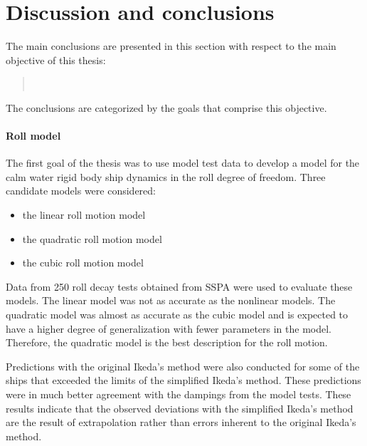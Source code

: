 \chapter{Discussion and conclusions\label{ch:conclusions}}

The main conclusions are presented in this section with respect to the main objective of this thesis:
\begin{quote} 
\vspace{0.1cm}
\objective \\
\vspace{-0.3cm}
\end{quote}
\noindent The conclusions are categorized by the goals that comprise this objective.

\subsubsection*{\normalfont \color{black} \textbf{Roll model}}
The first goal of the thesis was to use model test data to develop a model for the calm water rigid body ship dynamics in the roll degree of freedom. 
Three candidate models were considered:
\vspace{5pt}
\begin{itemize}
    \setlength\itemsep{5pt}
    \item the linear roll motion model
    \item the quadratic roll motion model
    \item the cubic roll motion model
\end{itemize}
\vspace{5pt}
\noindent Data from 250 roll decay tests obtained from SSPA were used to evaluate these models. The linear model was not as accurate as the nonlinear models. The quadratic model was almost as accurate as the cubic model and is expected to have a higher degree of generalization with fewer parameters in the model. Therefore,  the quadratic model is the best description for the roll motion. 

Predictions with the original Ikeda's method were also conducted for some of the ships that exceeded the limits of the simplified Ikeda's method. These predictions were in much better agreement with the dampings from the model tests. These results indicate that the observed deviations with the simplified Ikeda's method are the result of extrapolation rather than errors inherent 
to the original Ikeda's method.

